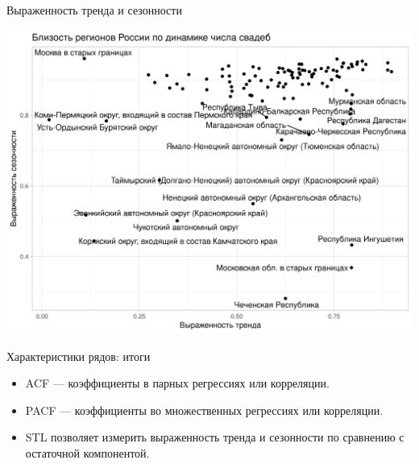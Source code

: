   \begin{frame}{Выраженность тренда и сезонности}

    \includegraphics[width=\textwidth]{pictures/om_ts_01-138.png}

    
  \end{frame}
  


\begin{frame}{Характеристики рядов: итоги}

  \begin{itemize}[<+->]
    \item ACF — коэффициенты в \alert{парных} регрессиях или корреляции.
    \item PACF — коэффициенты во \alert{множественных} регрессиях или корреляции.
    \item STL позволяет измерить \alert{выраженность тренда и сезонности} по сравнению с остаточной компонентой.
  \end{itemize}
\end{frame}

